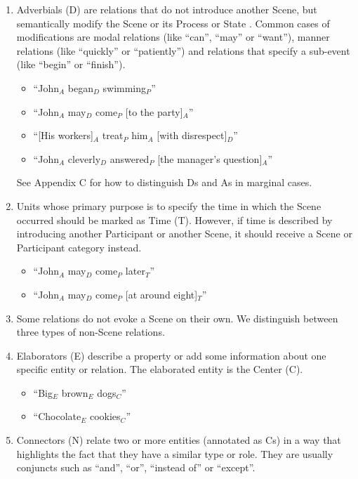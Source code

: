 \documentclass[11pt]{article}
\begin{document}
\begin{enumerate}
\item
Adverbials (D) are relations that do not introduce another Scene, but semantically modify the Scene or its Process or State . Common cases of modifications are modal relations (like ``can'', ``may'' or ``want''), manner relations (like ``quickly'' or ``patiently'') and relations that specify a sub-event (like ``begin'' or ``finish'').
\begin{itemize}
\item
``John$_A$ began$_D$ swimming$_P$''
\item
``John$_A$ may$_D$ come$_P$ [to the party]$_A$''
\item
``[His workers]$_A$ treat$_P$ him$_A$ [with disrespect]$_D$''
\item
``John$_A$ cleverly$_D$ answered$_P$ [the manager's question]$_A$''
\end{itemize}

See Appendix C for how to distinguish Ds and As in marginal cases.

\item
Units whose primary purpose is to specify the time in which the Scene occurred should be marked as Time (T). However, if time is described by introducing another Participant or another Scene, it should receive a Scene or Participant category instead.

\begin{itemize}
\item ``John$_A$ may$_D$ come$_P$ later$_T$''
\item ``John$_A$ may$_D$ come$_P$ [at around eight]$_T$''
\end{itemize}

\item
Some relations do not evoke a Scene on their own. We distinguish between three types of non-Scene relations.

\item
Elaborators (E) describe a property or add some information about one specific entity or relation. The elaborated entity is the Center (C).

\begin{itemize}
\item ``Big$_E$ brown$_E$ dogs$_C$''
\item ``Chocolate$_E$ cookies$_C$''
\end{itemize}

\item
Connectors (N) relate two or more entities (annotated as Cs) in a way that highlights the fact that they have a similar type or role. They are usually conjuncts such as ``and'', ``or'', ``instead of'' or ``except''.


\end{enumerate}
\end{document}
